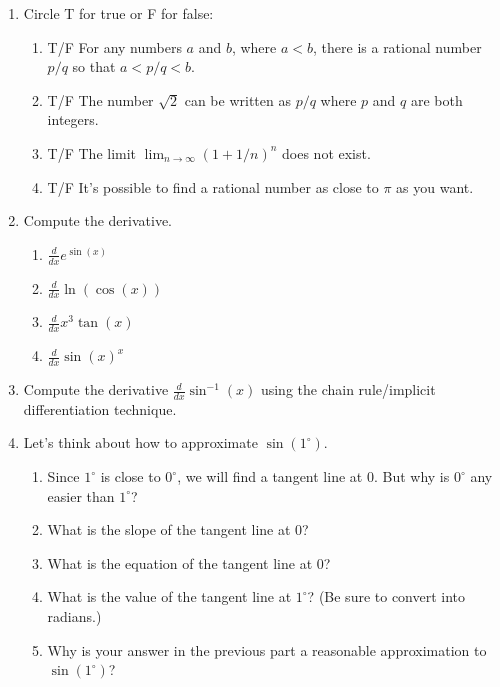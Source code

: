 \documentclass[11pt]{book}
\numberwithin{example}{chapter}
\begin{document}
\begin{enumerate}


\item Circle T for true or F for false:
\begin{enumerate}
\item T/F For any numbers $a$ and $b$, where $a<b$, there is a rational number $p/q$ so that $a<p/q<b$.

\item T/F The number $\sqrt{2}$ can be written as $p/q$ where $p$ and $q$ are both integers.

\item T/F The limit $\lim_{n\to \infty} (1+1/n)^{n}$ does not exist.

\item T/F It's possible to find a rational number as close to $\pi$ as you want.

\end{enumerate}


\item Compute the derivative.  

\begin{enumerate}
\item
$\frac{d}{dx} e^{\sin(x)}$
\item
$\frac{d}{dx} \ln(\cos(x))$
\item
$\frac{d}{dx} x^3\tan(x)$
\item
$\frac{d}{dx} \sin(x)^x$
\end{enumerate}




\item
Compute the derivative $\frac{d}{dx} \sin^{-1}(x)$ using the chain rule/implicit differentiation technique.  



\item Let's think about how to approximate $\sin(1^\circ)$.

\begin{enumerate}


\item  Since $1^\circ$ is close to $0^\circ$, we will find a tangent line at 0.  But why is $0^\circ$ any easier than $1^\circ$?



\item What is the slope of the tangent line at $0$?



\item What is the equation of the tangent line at $0$?



\item What is the value of the tangent line at $1^\circ$?  (Be sure to convert into radians.)



\item Why is your answer in the previous part a reasonable approximation to $\sin(1^\circ)$?

\end{enumerate}


\end{enumerate}
\end{document}
